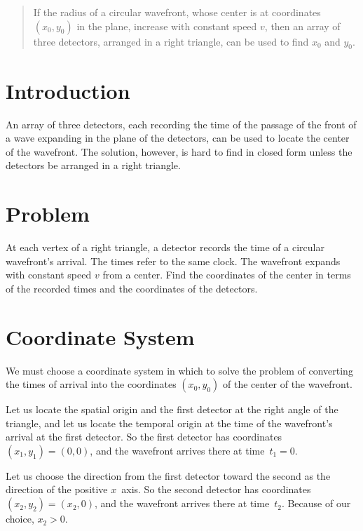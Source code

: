 \documentclass[twocolumn]{article}
\begin{document}
\thispagestyle{fancy}

\begin{abstract}

   If the radius of a circular wavefront, whose center is at coordinates
   $(x_0,y_0)$ in the plane, increase with constant speed $v$, then an array of
   three detectors, arranged in a right triangle, can be used to find $x_0$ and
   $y_0$.

\end{abstract}

\section{Introduction}

An array of three detectors, each recording the time of the passage of the
front of a wave expanding in the plane of the detectors, can be used to locate
the center of the wavefront.  The solution, however, is hard to find in closed
form unless the detectors be arranged in a right triangle.

\section{Problem}

At each vertex of a right triangle, a detector records the time of a circular
wavefront's arrival.  The times refer to the same clock.  The wavefront expands
with constant speed $v$ from a center.  Find the coordinates of the center in
terms of the recorded times and the coordinates of the detectors.

\section{Coordinate System}

We must choose a coordinate system in which to solve the problem of converting
the times of arrival into the coordinates $(x_0, y_0)$ of the center of the
wavefront.

Let us locate the spatial origin and the first detector at the right angle of
the triangle, and let us locate the temporal origin at the time of the
wavefront's arrival at the first detector.  So the first detector has
coordinates $(x_1, y_1) = (0, 0)$, and the wavefront arrives there at time~$t_1
= 0$.

Let us choose the direction from the first detector toward the second
as the direction of the positive $x$~axis.  So the second detector has
coordinates $(x_2, y_2) = (x_2, 0)$, and the wavefront arrives there at
time~$t_2$.  Because of our choice, $x_2 > 0$.
\end{document}
